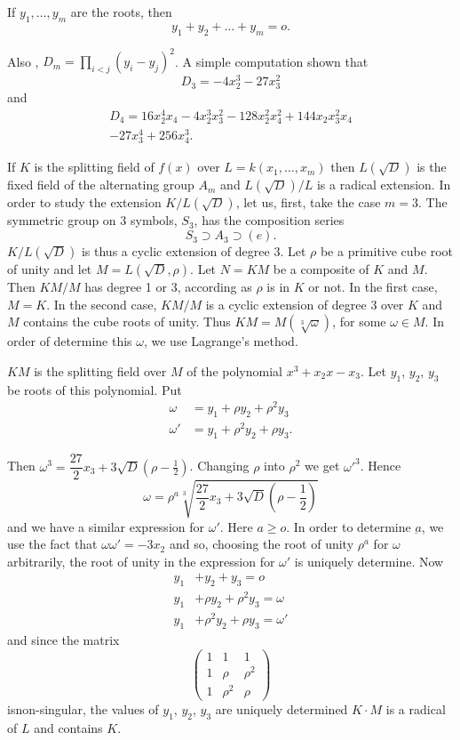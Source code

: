  If $y_1, \ldots , y_m$ are the roots, then
 $$
 y_1 +y_2 + \ldots + y_m = o.
 $$ 
 
 Also , $D_m= \prod\limits_{i < j}(y_i- y_j)^2$. A simple computation
 shown that 
 $$
 D_3 = -  4 x^3_2 - 27 x^2_3
 $$
 and 
\begin{gather*}
 D_4 =16 x^4_2x_4 -4 x^3_2 x^2_3 - 128 x^2_2 x^2_4 + 144 x_2 x_3^2 x_4\\ 
  - 27 x^4_3 + 256 x^3_4.
 \end{gather*}
 
 If $K$ is the splitting field of $f(x)$ over $L=k(x_1, \ldots, x_m)$
 then $L(\sqrt{D})$ is the fixed field of the  alternating  group
 $A_m$ and $L(\sqrt{D})/L$ is a radical extension. In order to study
 the extension $K/L(\sqrt{D})$, let us, first, take the case
 $m=3$. The symmetric group on 3 symbols, $S_3$, has the composition
 series  
 $$
 S_3 \supset A_3 \supset (e). 
 $$\pageoriginale
  $K/L(\sqrt{D})$ is thus a cyclic extension of degree 3. Let
 $\rho$ be a primitive cube root  of unity and let $M=L(\sqrt{D},
 \rho)$. Let $N=KM$ be a composite of $K$ and $M$. Then  $KM/M$ has
 degree 1 or 3, according as $\rho$ is in $K$ or not. In the
 first  case, $M=K$. In the second case, $KM/M$ is a cyclic
 extension  of degree  3 over $K$ and $M$ contains the cube roots
 of unity. Thus  $KM=M(\sqrt[3]{\omega})$, for some  $\omega \in M$. In
 order  of determine  this $\omega$, we use Lagrange's method.  
 
 $KM$ is the splitting field over $M$ of the polynomial $x^3+
 x_2x-x_3$. Let $y_1$, $y_2$, $y_3$ be roots of this polynomial. Put 
 \begin{align*}
\omega &= y_1 + \rho y_2 +\rho^2 y_3\\
\omega' &= y_1 + \rho^2 y_2 + \rho y_3.
   \end{align*}   
   
   Then $\omega^3 = \dfrac{27}{2} x_3  +3 \sqrt{D}(\rho-
   \frac{1}{2})$. Changing $\rho$ into $\rho^2$ we get
   $\omega'^3$. Hence 
   $$
   \omega = \rho^a \sqrt[3]{\frac{27}{2} x_3 +3
     \sqrt{D}(\rho- \frac{1}{2})} 
   $$
   and we have a similar expression for $\omega'$. Here $a \ge o$. In
   order to determine $\underbar{a}$, we use the fact that $\omega
   \omega'=-3x_2$ and so, choosing  the root of unity $\rho^a$ for
   $\omega$ arbitrarily, the root of unity in the expression for
   $\omega '$ is uniquely determine. Now 
   \begin{align*}
y_1 &+y_2 + y_3 =o\\
y_1 &+\rho y_2 +\rho^2 y_3 =\omega \\
y_1 &+\rho^2 y_2 + \rho y_3 =\omega'
   \end{align*}    
      and since the matrix
$$
\begin{pmatrix}
1 & 1 &1\\
1& \rho &\rho^2\\
1& \rho^2 &\rho
\end{pmatrix}
$$   
is\pageoriginale non-singular, the values of $y_1$, $y_2$, $y_3$ are
uniquely determined $K \cdot M$ is a radical of $L$ and contains $K$.  

